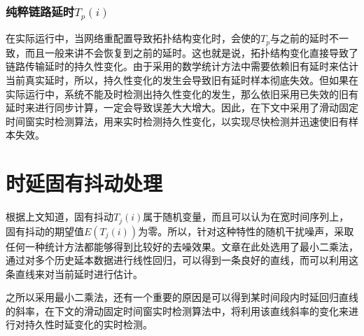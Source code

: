 \subsubsection{纯粹链路延时$T_{p}(i)$}
在实际运行中，当网络重配置导致拓扑结构变化时，会使的$T_{p}$与之前的延时不一致，而且一般来讲不会恢复到之前的延时。这也就是说，拓扑结构变化直接导致了链路传输延时的持久性变化。由于采用的数学统计方法中需要依赖旧有延时来估计当前真实延时，所以，持久性变化的发生会导致旧有延时样本彻底失效。但如果在实际运行中，系统不能及时检测出持久性变化的发生，那么依旧采用已失效的旧有延时来进行同步计算，一定会导致误差大大增大。因此，在下文中采用了滑动固定时间窗实时检测算法，用来实时检测持久性变化，以实现尽快检测并迅速使旧有样本失效。

\section{时延固有抖动处理}
根据上文知道，固有抖动$T_{j}(i)$属于随机变量，而且可以认为在宽时间序列上，固有抖动的期望值$E(T_{j}(i))$为零。所以，针对这种特性的随机干扰噪声，采取任何一种统计方法都能够得到比较好的去噪效果。文章在此处选用了最小二乘法，通过对多个历史延本数据进行线性回归，可以得到一条良好的直线，而可以利用这条直线来对当前延时进行估计。

之所以采用最小二乘法，还有一个重要的原因是可以得到某时间段内时延回归直线的斜率，在下文的滑动固定时间窗实时检测算法中，将利用该直线斜率的变化来进行对持久性时延变化的实时检测。



